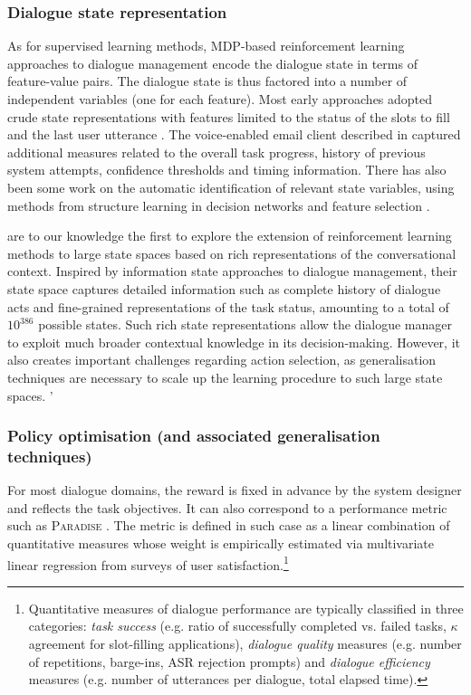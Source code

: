 \subsubsection*{Dialogue state representation}

As for supervised learning methods, MDP-based reinforcement learning approaches to dialogue management encode the dialogue state in terms of feature-value pairs.  The dialogue state is thus factored into a number of independent variables (one for each feature).  Most early approaches adopted crude state representations with features limited to the status of the slots to fill and the last user utterance \citep{817450,Singh:2000:EER:647288.723412,Scheffler:2002}.  The voice-enabled email client described in \cite{Walker:2000} captured additional measures related to the overall task progress, history of previous system attempts, confidence thresholds and timing information.  There has also been some work on the automatic identification of relevant state variables, using methods from structure learning in decision networks \citep{PaekC06} and feature selection \citep{tetreault2006using}. 

\cite{Henderson:2008} are to our knowledge the first to explore the extension of reinforcement learning methods to large state spaces based on rich representations of the conversational context. Inspired by information state approaches to dialogue management, their state space captures detailed information such as complete history of dialogue acts and fine-grained representations of the task status, amounting to a total of $10^{386}$ possible states.  Such rich state representations allow the dialogue manager to exploit much broader contextual knowledge in its decision-making.  However, it also creates important challenges regarding action selection, as generalisation techniques are necessary to scale up the learning procedure to such large state spaces.
'
\subsubsection{Policy optimisation (and associated generalisation techniques)}

For most dialogue domains, the reward is fixed in advance by the system designer and reflects the task objectives.  It can also correspond to a performance metric such as \textsc{Paradise} \citep{Walker:2000}.  The metric is defined in such case as a linear combination of quantitative measures whose weight is empirically estimated via multivariate linear regression from surveys of user satisfaction.\footnote{Quantitative measures of dialogue performance are typically classified in three categories: \textit{task success} (e.g. ratio of successfully completed vs. failed tasks, $\kappa$ agreement for slot-filling applications), \textit{dialogue quality} measures (e.g. number of repetitions, barge-ins, ASR rejection prompts) and \textit{dialogue efficiency} measures (e.g. number of utterances per dialogue, total elapsed time).}


